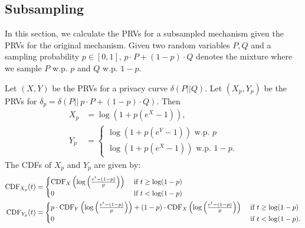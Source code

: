 \subsection{Subsampling}
In this section, we calculate the PRVs for a subsampled mechanism given the PRVs for the original mechanism. Given two random variables $P,Q$ and a sampling probability $p\in [0,1]$,  $p\cdot P+(1-p)\cdot Q$ denotes the mixture where we sample $P$ w.p. $p$ and $Q$ w.p. $1-p.$
\begin{proposition}
	\label{prop:mixture_f_p_privacy_rv}
	Let $(X,Y)$ be the PRVs for a privacy curve $\delta(P||Q)$. Let $(X_p,Y_p)$ be the PRVs for $\delta_p=\delta(P||\ p\cdot P+(1-p)\cdot Q)$. Then
	\begin{align*}
		X_p&=\log(1+p(e^X-1)),\\
		Y_p&=\begin{cases}
			\log(1+p(e^Y-1)) \text{ w.p. } p\\
			\log(1+p(e^X-1)) \text{ w.p. } 1-p.
		\end{cases}
	\end{align*}
	The CDFs of $X_p$ and $Y_p$ are given by:
	\begin{align*}
		\mathrm{CDF}_{X_p}(t) &= \begin{cases}
			\mathrm{CDF}_X\left(\log\left( \frac{e^t-(1-p)}{p}\right) \right) &\text{ if } t\ge \log(1-p)\\
			0 &\text{ if } t< \log(1-p)
		\end{cases}\\
		\mathrm{CDF}_{Y_p}(t) &= \begin{cases}
			p\cdot \mathrm{CDF}_Y\left( \log\left( \frac{e^t-(1-p)}{p}\right) \right) + (1-p)\cdot \mathrm{CDF}_X\left( \log\left( \frac{e^t-(1-p)}{p}\right) \right) &\text{ if } t\ge \log(1-p)\\
			0 & \text{ if } t <\log(1-p).
		\end{cases}
	\end{align*}

\end{proposition}


